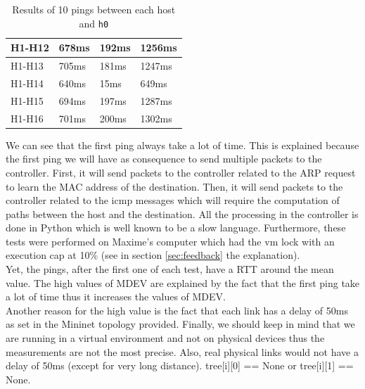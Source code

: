 \documentclass[a4paper, 11pt, oneside]{article}
\begin{document}
\begin{table}[H]
\begin{tabular}{|l|l|l|l|}
H1-H12                                     & 678ms                              & 192ms                              & 1256ms                                 \\ \hline
H1-H13                                     & 705ms                              & 181ms                              & 1247ms                                 \\ \hline
H1-H14                                     & 640ms                              & 15ms                              & 649ms                                 \\ \hline
H1-H15                                     & 694ms                              & 197ms                              & 1287ms                                 \\ \hline
H1-H16                                     & 701ms                              & 200ms                              & 1302ms                                 \\ \hline
\end{tabular}
\caption{Results of 10 pings between each host and \texttt{h0}}
\label{table:STCPings}
\end{table}
We can see that the first ping always take a lot of time. This is explained because the first ping we will have as consequence to send multiple packets to the controller. First, it will send packets to the controller related to the ARP request to learn the MAC address of the destination. Then, it will send packets to the controller related to the icmp messages which will require the computation of paths between the host and the destination. All the processing in the controller is done in Python which is well known to be a slow language. Furthermore, these tests were performed on Maxime's computer which had the vm lock with an execution cap at 10\% (see in section \ref{sec:feedback} the explanation).\\
Yet, the pings, after the first one of each test, have a RTT around the mean value. The high values of MDEV are explained by the fact that the first ping take a lot of time thus it increases the values of MDEV.\\
Another reason for the high value is the fact that each link has a delay of 50ms as set in the Mininet topology provided. Finally, we should keep in mind that we are running in a virtual environment and not on physical devices thus the measurements are not the most precise. Also, real physical links would not have a delay of 50ms (except for very long distance).
tree[i][0] == None or tree[i][1] == None.
\end{document}
